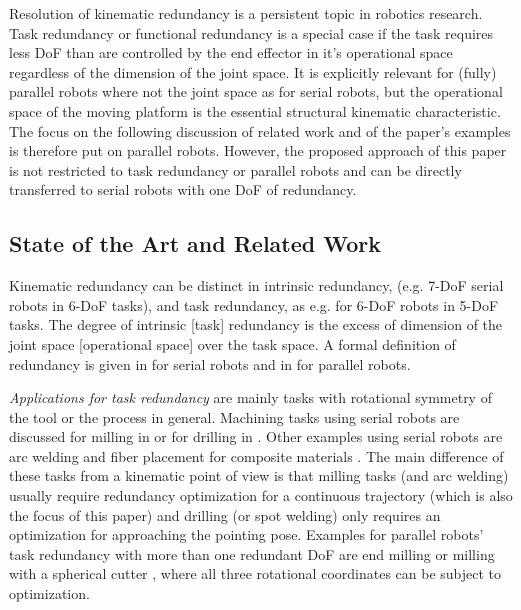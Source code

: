 \documentclass[runningheads]{llncs}
\begin{document}

Resolution of kinematic redundancy is a persistent topic in robotics research.
Task redundancy or functional redundancy is a special case if the task requires less DoF than are controlled by the end effector in it's operational space regardless of the dimension of the joint space.
It is explicitly relevant for (fully) parallel robots where not the joint space as for serial robots, but the operational space of the moving platform is the essential structural kinematic characteristic.
The focus on the following discussion of related work and of the paper's examples is therefore put on parallel robots.
However, the proposed approach of this paper is not restricted to task redundancy or parallel robots and can be directly transferred to serial robots with one DoF of redundancy.

\subsection{State of the Art and Related Work}

Kinematic redundancy can be distinct in intrinsic redundancy, (e.g. 7-DoF serial robots in 6-DoF tasks), and task redundancy, as e.g. for 6-DoF robots in 5-DoF tasks.
The degree of intrinsic [task] redundancy is the excess of dimension of the joint space [operational space] over the task space.
A formal definition of redundancy is given in \cite{SciaviccoSic2000,HuoBar2008,LegerAng2016} for serial robots and in \cite{GosselinSch2018} for parallel robots.

\emph{Applications for task redundancy} are mainly tasks with rotational symmetry of the tool or the process in general.
Machining tasks using serial robots are discussed for milling in \cite{ZargarbashiKhaAng2012,MousaviGagBouRay2017,MousaviGagBouRay2018} or for drilling in \cite{ZhuQuCaoYan2013}.
Other examples using serial robots are arc welding \cite{HuoBar2008} and fiber placement for composite materials \cite{GaoPasCar2017}.
The main difference of these tasks from a kinematic point of view is that milling tasks (and arc welding) usually require redundancy optimization for a continuous trajectory (which is also the focus of this paper) and drilling (or spot welding) only requires an optimization for approaching the pointing pose. %
Examples for parallel robots' task redundancy with more than one redundant DoF are end milling \cite{ShawChe2001} or milling with a spherical cutter \cite{SmirnovPlyMir2013}, where all three rotational coordinates can be subject to optimization.
\end{document}
